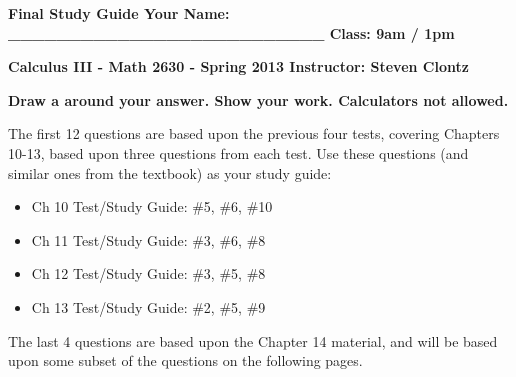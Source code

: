 \documentclass[12pt]{article}
\newcommand{\up}{$~$\vspace*{-0.7in}}
\newcommand{\liner}{\noindent\underline{\hspace*{7in}}}
\newcommand{\spac}{\hspace*{3em}}
\begin{document}
\up

{\bf Final Study Guide  \hspace*{1em} Your Name: \_\_\_\_\_\_\_\_\_\_\_\_\_\_\_\_\_\_\_\_\_\_\_\_\_\_ \hspace*{1em} Class: 9am / 1pm}

\vspace*{0.2in}

\centerline{ \bf Calculus III - Math 2630 - Spring 2013 \spac Instructor: Steven Clontz}

\vspace*{0.2in}

\centerline{\bf Draw a  around your answer. Show your work. Calculators not allowed.}

\indent\liner

\vspace*{.2in}

The first 12 questions are based upon the previous four tests, covering Chapters 10-13, based upon three questions from each test. Use these questions (and similar ones from the textbook) as your study guide:

\begin{itemize}
\item Ch 10 Test/Study Guide: \#5, \#6, \#10
\item Ch 11 Test/Study Guide: \#3, \#6, \#8
\item Ch 12 Test/Study Guide: \#3, \#5, \#8
\item Ch 13 Test/Study Guide: \#2, \#5, \#9
\end{itemize}

The last 4 questions are based upon the Chapter 14 material, and will be based upon some subset of the questions on the following pages.

\newpage\up
\end{document}
